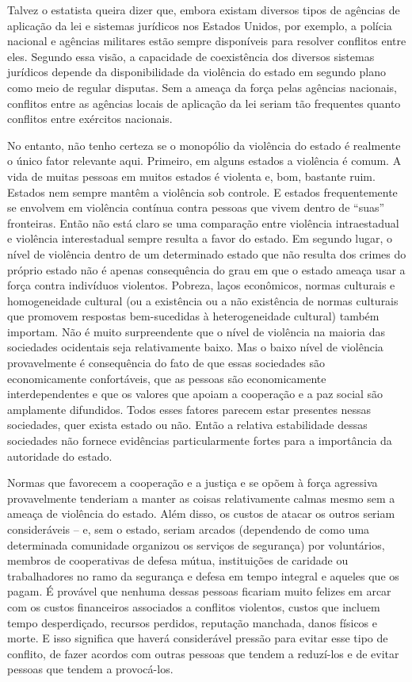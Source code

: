 Talvez o estatista queira dizer que, embora existam diversos tipos de agências de aplicação da lei e sistemas jurídicos nos Estados Unidos, por exemplo, a polícia nacional e agências militares estão sempre disponíveis para resolver conflitos entre eles. Segundo essa visão, a capacidade de coexistência dos diversos sistemas jurídicos depende da disponibilidade da violência do estado em segundo plano como meio de regular disputas. Sem a ameaça da força pelas agências nacionais, conflitos entre as agências locais de aplicação da lei seriam tão frequentes quanto conflitos entre exércitos nacionais.

No entanto, não tenho certeza se o monopólio da violência do estado é realmente o único fator relevante aqui. Primeiro, em alguns estados a violência é comum. A vida de muitas pessoas em muitos estados é violenta e, bom, bastante ruim. Estados nem sempre mantêm a violência sob controle. E estados frequentemente se envolvem em violência contínua contra pessoas que vivem dentro de ``suas'' fronteiras. Então não está claro se uma comparação entre violência intraestadual e violência interestadual sempre resulta a favor do estado. Em segundo lugar, o nível de violência dentro de um determinado estado que não resulta dos crimes do próprio estado não é apenas consequência do grau em que o estado ameaça usar a força contra indivíduos violentos. Pobreza, laços econômicos, normas culturais e homogeneidade cultural (ou a existência ou a não existência de normas culturais que promovem respostas bem-sucedidas à heterogeneidade cultural) também importam. Não é muito surpreendente que o nível de violência na maioria das sociedades ocidentais seja relativamente baixo. Mas o baixo nível de violência provavelmente é consequência do fato de que essas sociedades são economicamente confortáveis, que as pessoas são economicamente interdependentes e que os valores que apoiam a cooperação e a paz social são amplamente difundidos. Todos esses fatores parecem estar presentes nessas sociedades, quer exista estado ou não. Então a relativa estabilidade dessas sociedades não fornece evidências particularmente fortes para a importância da autoridade do estado.

Normas que favorecem a cooperação e a justiça e se opõem à força agressiva provavelmente tenderiam a manter as coisas relativamente calmas mesmo sem a ameaça de violência do estado. Além disso, os custos de atacar os outros seriam consideráveis -- e, sem o estado, seriam arcados (dependendo de como uma determinada comunidade organizou os serviços de segurança) por voluntários, membros de cooperativas de defesa mútua, instituições de caridade ou trabalhadores no ramo da segurança e defesa em tempo integral e aqueles que os pagam. É provável que nenhuma dessas pessoas ficariam muito felizes em arcar com os custos financeiros associados a conflitos violentos, custos que incluem tempo desperdiçado, recursos perdidos, reputação manchada, danos físicos e morte. E isso significa que haverá considerável pressão para evitar esse tipo de conflito, de fazer acordos com outras pessoas que tendem a reduzí-los e de evitar pessoas que tendem a provocá-los.

